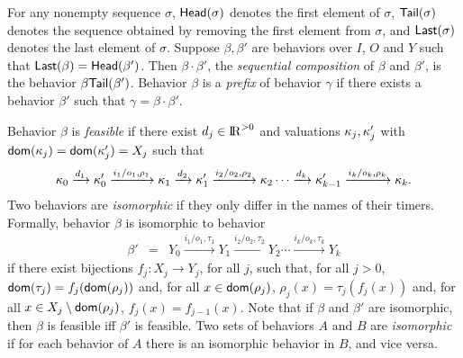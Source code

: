 For any nonempty sequence $\sigma$, $\mathsf{Head}({\sigma})$ denotes the first element of $\sigma$, $\mathsf{Tail}({\sigma})$ denotes the sequence obtained by removing the first element from $\sigma$, and $\mathsf{Last}({\sigma})$ denotes the last element of $\sigma$.
Suppose $\beta, \beta'$ are behaviors over $I$, $O$ and $Y$ such that $\mathsf{Last}({\beta}) = \mathsf{Head}({\beta'})$.
Then $\beta \cdot \beta'$, the \emph{sequential composition} of $\beta$ and $\beta'$, is the behavior $\beta \mathsf{Tail}({\beta'})$.
Behavior $\beta$ is a \emph{prefix} of behavior $\gamma$ if there exists a behavior $\beta'$ such that $\gamma = \beta \cdot \beta'$.

Behavior $\beta$ is \emph{feasible} if there exist $d_j \in {\rm I\!R}^{> 0}$ and valuations $\kappa_j, \kappa'_j$ 
with ${\textsf{dom}}(\kappa_j) = {\textsf{dom}}(\kappa'_j) = X_j$ such that
\[
\kappa_0 \xrightarrow{d_1} \kappa'_0 \xrightarrow{i_1/o_1, \rho_1} \kappa_1 \xrightarrow{d_2} \kappa'_1 \xrightarrow{i_2/o_2, \rho_2} \kappa_2 \cdots
\xrightarrow{d_k} \kappa'_{k-1} \xrightarrow{i_k/o_k, \rho_k} \kappa_{k}.
\]
Two behaviors are \emph{isomorphic} if they only differ in the names of their timers. Formally, behavior $\beta$
is isomorphic to behavior
\begin{eqnarray*}
\beta' & = & Y_0 \xrightarrow{i_1/o_1, \tau_1} Y_1  \xrightarrow{i_2/o_2, \tau_2} Y_2 \cdots \xrightarrow{i_k/o_k, \tau_k} Y_{k}
\end{eqnarray*}
if there exist bijections $f_j : X_j \rightarrow Y_j$, for all $j$, such that, for all $j>0$, ${\textsf{dom}}(\tau_j) = f_j({\textsf{dom}}(\rho_j))$ and, for all $x \in{\textsf{dom}}(\rho_j)$,
$\rho_j(x) = \tau_j (f_j(x))$ and, for all $x \in X_j \setminus {\textsf{dom}}(\rho_j)$, $f_j(x) = f_{j-1}(x)$.
Note that if $\beta$ and $\beta'$ are isomorphic, then $\beta$ is feasible iff $\beta'$ is feasible.
Two sets of behaviors $A$ and $B$ are \emph{isomorphic} if for each behavior of $A$ there is an isomorphic behavior in $B$,
and vice versa.

